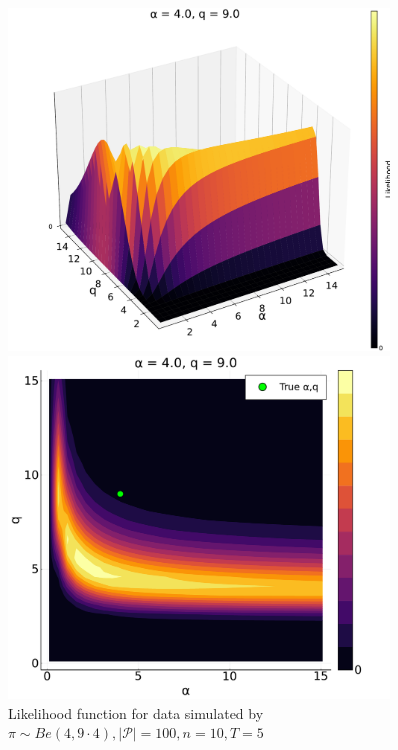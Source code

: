 \documentclass[a4paper, 12pt]{article}
\begin{document}
\begin{figure}
    \centering
    \begin{minipage}{0.55\textwidth}
        \centering
        \includegraphics[width=0.9\textwidth]{../figures/Likelihood_sfplt_4.0.pdf} %
    \end{minipage}\hfill
    \begin{minipage}{0.45\textwidth}
        \centering
        \includegraphics[width=0.9\textwidth]{../figures/Likelihood_contplt_4.0.pdf} %
    \end{minipage}
    \caption{\small \small Likelihood function for data simulated by $\pi \sim Be(4, 9 \cdot 4), |\mathcal{P}| = 100, n = 10, T = 5$}
\end{figure}
\end{document}
